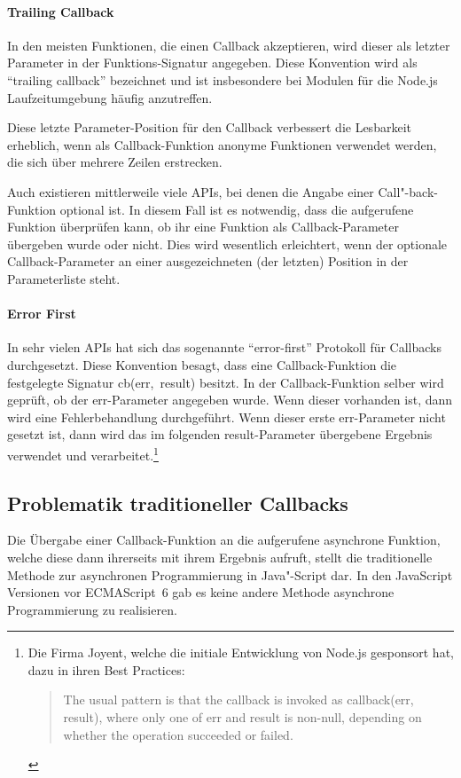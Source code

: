 \documentclass[
11pt, %
a4paper, %
oneside, %
pdfspacing, %
headinclude,
BCOR5mm, %
ngerman, %
bibtotocnumbered,
]{scrartcl}
\begin{document}
	\paragraph{Trailing Callback} In den meisten Funktionen, die einen Callback akzeptieren, wird dieser als letzter Parameter in der Funktions-Signatur angegeben. Diese Konvention wird als "`trailing callback"' bezeichnet und ist insbesondere bei Modulen für die Node.js Laufzeitumgebung häufig anzutreffen. 
	
	Diese letzte Parameter-Position für den Callback verbessert die Lesbarkeit erheblich, wenn als Callback-Funktion anonyme Funktionen verwendet werden, die sich über mehrere Zeilen erstrecken.  
	
	Auch existieren mittlerweile viele APIs, bei denen die Angabe einer Call"-back-Funktion optional ist. 
	In diesem Fall ist es notwendig, dass die aufgerufene Funktion überprüfen kann, ob ihr eine Funktion als Callback-Parameter übergeben wurde oder nicht. Dies wird wesentlich erleichtert, wenn der optionale Callback-Parameter an einer ausgezeichneten (der letzten) Position in der Parameterliste steht.
	
	\paragraph{Error First} 
	In sehr vielen APIs hat sich das sogenannte "`error-first"' Protokoll für Callbacks durchgesetzt. Diese Konvention besagt, dass eine Callback-Funktion die festgelegte Signatur \textsf{cb(err,~result)} besitzt.
	In der Callback-Funktion selber wird geprüft, ob der \textsf{err}-Parameter angegeben wurde. Wenn dieser vorhanden ist, dann wird eine Fehlerbehandlung durchgeführt. Wenn dieser erste \textsf{err}-Parameter nicht gesetzt ist, dann wird das im folgenden \textsf{result}-Parameter übergebene Ergebnis verwendet und verarbeitet.\footnote{Die Firma Joyent, welche die initiale Entwicklung von Node.js gesponsort hat, dazu in ihren Best Practices:\begin{quote}The usual pattern is that the callback is invoked as callback(err, result), where only one of err and result is non-null, depending on whether the operation succeeded or failed.~\citep{Joyent.}\end{quote}}
	

	\subsection{Problematik traditioneller Callbacks}
	Die Übergabe einer Callback-Funktion an die aufgerufene asynchrone Funktion, welche diese dann ihrerseits mit ihrem Ergebnis aufruft, stellt die traditionelle Methode zur asynchronen Programmierung in Java"-Script dar. In den JavaScript Versionen vor ECMAScript~6 gab es keine andere Methode asynchrone Programmierung zu realisieren.
	
\end{document}
